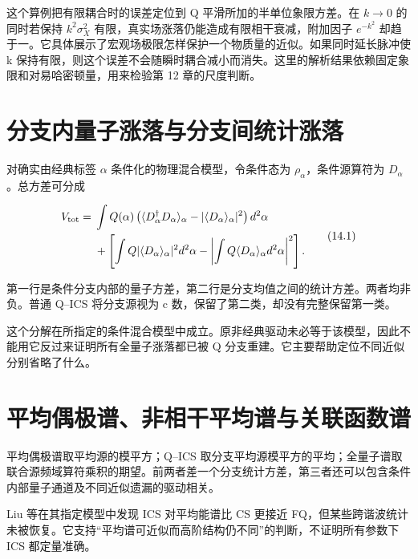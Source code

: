 \documentclass[UTF8,a4paper,zihao=-4,openany,fontset=fandol]{ctexbook}
\begin{document}
这个算例把有限耦合时的误差定位到 Q 平滑所加的半单位象限方差。在 $k\to0$ 的同时若保持 $k^2\sigma_X^2$ 有限，真实场涨落仍能造成有限相干衰减，附加因子 $e^{-k^2}$ 却趋于一。它具体展示了宏观场极限怎样保护一个物质量的近似。如果同时延长脉冲使 k 保持有限，则这个误差不会随瞬时耦合减小而消失。这里的解析结果依赖固定象限和对易哈密顿量，用来检验第 12 章的尺度判断。



\section{分支内量子涨落与分支间统计涨落}\label{sec:14:4}


对确实由经典标签 $\alpha$ 条件化的物理混合模型，令条件态为 $\rho_\alpha$，条件源算符为 $D_\alpha$。总方差可分成



\begin{equation*}
\begin{aligned}
V_{\rm tot}={}&\int Q(\alpha)
\left(\langle D_\alpha^\dagger D_\alpha\rangle_\alpha
-|\langle D_\alpha\rangle_\alpha|^2\right)d^2\alpha\\
&+\left[\int Q|\langle D_\alpha\rangle_\alpha|^2d^2\alpha
-\left|\int Q\langle D_\alpha\rangle_\alpha d^2\alpha\right|^2\right].
\end{aligned}
\tag{14.1}\label{eq:14.1}
\end{equation*}


第一行是条件分支内部的量子方差，第二行是分支均值之间的统计方差。两者均非负。普通 Q–ICS 将分支源视为 c 数，保留了第二类，却没有完整保留第一类。



这个分解在所指定的条件混合模型中成立。原非经典驱动未必等于该模型，因此不能用它反过来证明所有全量子涨落都已被 Q 分支重建。它主要帮助定位不同近似分别省略了什么。



\section{平均偶极谱、非相干平均谱与关联函数谱}\label{sec:14:5}


平均偶极谱取平均源的模平方；Q–ICS 取分支平均源模平方的平均；全量子谱取联合源频域算符乘积的期望。前两者差一个分支统计方差，第三者还可以包含条件内部量子通道及不同近似遗漏的驱动相关。



Liu 等在其指定模型中发现 ICS 对平均能谱比 CS 更接近 FQ，但某些跨谐波统计未被恢复。它支持“平均谱可近似而高阶结构仍不同”的判断，不证明所有参数下 ICS 都定量准确。
\end{document}
